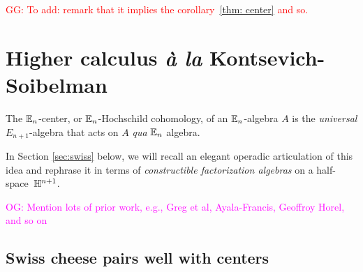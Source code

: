 \documentclass[11pt]{amsart}
\numberwithin{equation}{section}
\def\brian{\textcolor{blue}{BW: }\textcolor{blue}}
\def\owen{\textcolor{magenta}{OG: }\textcolor{magenta}}
\def\greg{\textcolor{red}{GG: }\textcolor{red}}
\begin{document}
\greg{To add: remark that it implies the corollary~\ref{thm: center} and so.}

\section{Higher calculus {\it \`a la} Kontsevich-Soibelman}
\label{sec: TT}

The $\mathbb E_n$-center, or $\mathbb E_n$-Hochschild cohomology, of an $\mathbb E_n$-algebra $A$ is the {\em universal} $E_{n+1}$-algebra that acts on $A$ {\em qua} $\mathbb E_n$ algebra. 

In Section \ref{sec:swiss} below, we will recall an elegant operadic articulation of this idea and rephrase it in terms of {\em constructible factorization algebras} on a half-space~$\mathbb H^{n+1}$. 

\owen{Mention lots of prior work, e.g., Greg et al, Ayala-Francis, Geoffroy Horel, and so on}

%
%
%
%


\subsection{Swiss cheese pairs well with centers}
\end{document}
